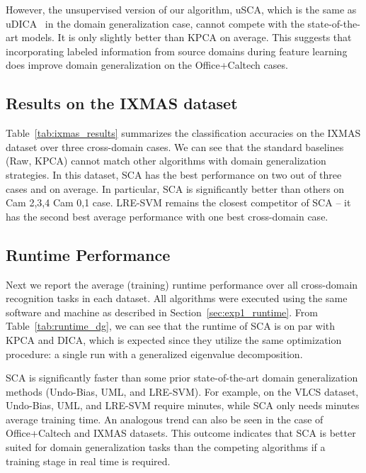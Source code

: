 \documentclass[10pt,journal,compsoc]{IEEEtran}
\begin{document}
However, the unsupervised version of our algorithm, uSCA, which is the same as uDICA~\cite{Muandet2013} in the domain generalization case, cannot compete with the state-of-the-art models. 
It is only slightly better than KPCA on average.
This suggests that incorporating labeled information from source domains during feature learning does improve domain generalization on the Office+Caltech cases.

\subsection{Results on the IXMAS dataset}
Table~\ref{tab:ixmas_results} summarizes the classification accuracies on the IXMAS dataset over three cross-domain cases.
We can see that the standard baselines (Raw, KPCA) cannot match other algorithms with domain generalization strategies.
In this dataset, SCA has the best performance on two out of three cases and on average. 
In particular, SCA is significantly better than others on Cam 2,3,4  Cam 0,1 case.
LRE-SVM remains the closest competitor of SCA -- it has the second best average performance with one best cross-domain case.

\vspace{-1em}
\subsection{Runtime Performance}
Next we report the average (training) runtime performance over all cross-domain recognition tasks in each dataset.
All algorithms were executed using the same software and machine as described in Section~\ref{sec:exp1_runtime}.
From Table~\ref{tab:runtime_dg}, we can see that the runtime of SCA is on par with KPCA and DICA, which is expected since they utilize the same optimization procedure: a single run with a generalized eigenvalue decomposition.


SCA is significantly faster than some prior state-of-the-art domain generalization methods (Undo-Bias, UML, and LRE-SVM).
For example, on the VLCS dataset, Undo-Bias, UML, and LRE-SVM require  minutes, while SCA only needs  minutes average training time.
An analogous trend can also be seen in the case of Office+Caltech and IXMAS datasets.
This outcome indicates that SCA is better suited for domain generalization tasks than the competing algorithms if a training stage in real time is required.

\begin{table}[!htb]
	\caption{Average domain generalization runtime (seconds) over all cross-domain recognition tasks in each dataset.}
	\vspace{-1em}
	\centering
	\label{tab:runtime_dg}
\end{table}
\end{document}
